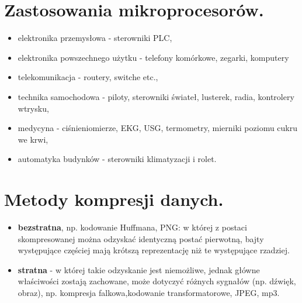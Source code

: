 \documentclass[12pt,a4paper]{article}
\begin{document}
	\section{Zastosowania mikroprocesorów.}
	\begin{itemize}
		\item elektronika przemysłowa - sterowniki PLC,
		\item elektronika powszechnego użytku - telefony komórkowe, zegarki, komputery
		\item telekomunikacja - routery, switche etc.,
		\item technika samochodowa - piloty, sterowniki świateł, lusterek, radia, kontrolery wtrysku,
		\item medycyna - ciśnieniomierze, EKG, USG, termometry, mierniki poziomu cukru we krwi,
		\item automatyka budynków - sterowniki klimatyzacji i rolet.
	\end{itemize}

	\section{Metody kompresji danych.}
	\begin{itemize}
		\item \textbf{bezstratna}, np. kodowanie Huffmana, PNG: w której z postaci skompresowanej można odzyskać identyczną postać pierwotną, bajty występujące częściej mają krótszą reprezentację niż te występujące rzadziej. 
		\item \textbf{stratna} - w której takie odzyskanie jest niemożliwe, jednak główne właściwości zostają zachowane, może dotyczyć różnych sygnałów (np. dźwięk, obraz), np. kompresja falkowa,kodowanie transformatorowe, JPEG, mp3.
	\end{itemize}
\end{document}
